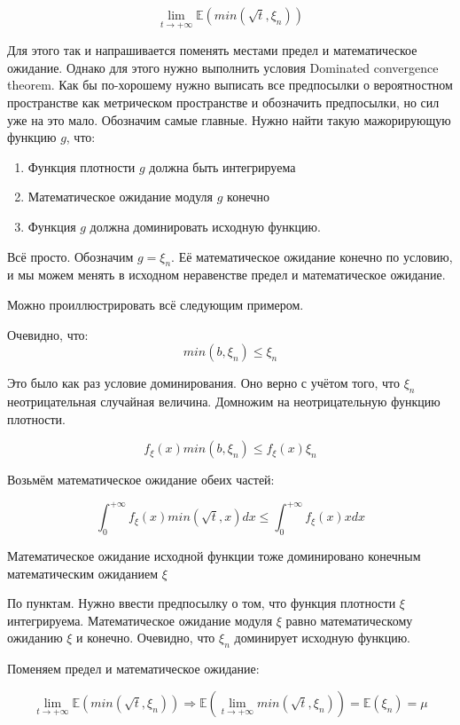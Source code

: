 \documentclass[a4paper,12pt]{article}
\def \mbb{\mathbb}
\def \E{\mbb{E}}
\begin{document}
\[  \lim\limits_{t \rightarrow +\infty}   \E(min(\sqrt{t}, \xi_n)) \]

Для этого так и напрашивается поменять местами предел и математическое ожидание. Однако для этого нужно выполнить условия Dominated convergence theorem. Как бы по-хорошему нужно выписать все предпосылки о вероятностном пространстве как метрическом пространстве и обозначить предпосылки, но сил уже на это мало. Обозначим самые главные. Нужно найти такую мажорирующую функцию $ g $, что:

\begin{enumerate}[\Sun]
	\item Функция плотности $ g $ должна быть интегрируема
	
	\item Математическое ожидание модуля $ g $ конечно
	
	\item Функция $ g  $ должна доминировать исходную функцию.
\end{enumerate}

Всё просто. Обозначим $ g = \xi_n $. Её математическое ожидание конечно по условию, и мы можем менять в исходном неравенстве предел и математическое ожидание.

Можно проиллюстрировать всё следующим примером.

Очевидно, что:
\[ min(b, \xi_n) \le \xi_n\]

Это было как раз условие доминирования. Оно верно с учётом того, что $  \xi_n $ неотрицательная случайная величина. Домножим на неотрицательную функцию плотности.

\[f_\xi(x) min(b, \xi_n) \le f_\xi(x)\xi_n \]

Возьмём математическое ожидание обеих частей:

\[ \int_{0}^{+\infty} f_\xi(x) min(\sqrt{t}, x) dx \le \int_{0}^{+\infty} f_\xi(x) x dx \]


Математическое ожидание исходной функции тоже доминировано конечным математическим ожиданием $ \xi $

По пунктам. Нужно ввести предпосылку о том, что функция плотности $ \xi $ интегрируема. Математическое ожидание модуля $ \xi $ равно математическому ожиданию $ \xi $ и конечно. Очевидно, что $ \xi_n $  доминирует исходную функцию.

Поменяем предел и математическое ожидание:

\[  \lim\limits_{t \rightarrow +\infty}   \E(min(\sqrt{t}, \xi_n)) \Rightarrow    \E( \lim\limits_{t \rightarrow +\infty}  min(\sqrt{t}, \xi_n)) = \E(\xi_n)  = \mu\]
\end{document}
